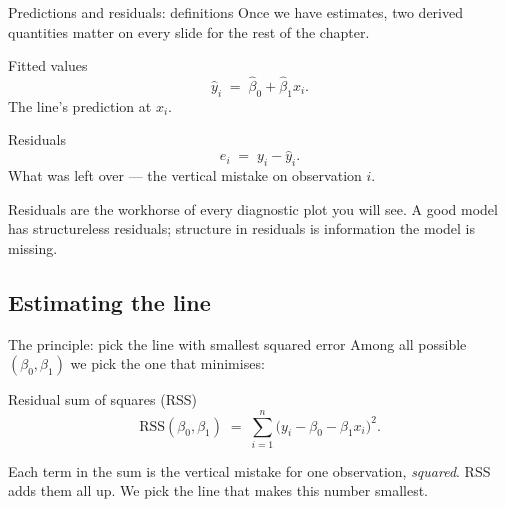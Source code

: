 \documentclass[aspectratio=169,11pt]{beamer}
\begin{document}
\begin{frame}{Predictions and residuals: definitions}
  Once we have estimates, two derived quantities matter on every slide
  for the rest of the chapter.
  \begin{block}{Fitted values}
    \[
      \hat y_i \;=\; \hat\beta_0 + \hat\beta_1 x_i.
    \]
    The line's prediction at $x_i$.
  \end{block}
  \begin{block}{Residuals}
    \[
      e_i \;=\; y_i - \hat y_i.
    \]
    What was left over --- the vertical mistake on observation $i$.
  \end{block}
  \begin{takeaway}
    Residuals are the workhorse of every diagnostic plot you will see.
    A good model has structureless residuals; structure in residuals
    is information the model is missing.
  \end{takeaway}
\end{frame}


\subsection{Estimating the line}

\begin{frame}{The principle: pick the line with smallest squared error}
  Among all possible $(\beta_0, \beta_1)$ we pick the one that
  minimises:
  \begin{block}{Residual sum of squares (RSS)}
    \[
      \mathrm{RSS}(\beta_0, \beta_1)
        \;=\; \sum_{i=1}^n \bigl(y_i - \beta_0 - \beta_1 x_i\bigr)^2.
    \]
  \end{block}
  \begin{readme}
    Each term in the sum is the vertical mistake for one observation,
    \emph{squared}. RSS adds them all up. We pick the line that makes
    this number smallest.
  \end{readme}
\end{frame}
\end{document}
